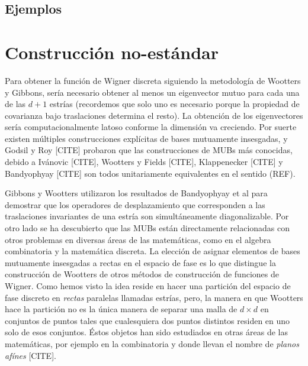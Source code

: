 \documentclass[a4paper]{report}
\begin{document}
  \section{Ejemplos}









  

  \chapter{Construcción no-estándar}

  Para obtener la función de Wigner discreta
  siguiendo la metodología de Wootters y Gibbons, sería
  necesario obtener al menos un eigenvector mutuo para cada
  una de las $d+1$ estrías (recordemos que solo uno es
  necesario porque la propiedad de covarianza bajo
  traslaciones determina el resto). La obtención de los
  eigenvectores sería computacionalmente latoso conforme la
  dimensión va creciendo. Por suerte existen múltiples
  construcciones explícitas de bases mutuamente insesgadas,
  y Godsil y Roy [CITE] probaron que las construcciones de
  MUBs más conocidas, debido a Ivánovic [CITE], Wootters y
  Fields [CITE], Klappenecker [CITE] y Bandyophyay [CITE]
  son todos unitariamente equivalentes en el sentido (REF).

  Gibbons y Wootters utilizaron los resultados de
  Bandyophyay et al para demostrar que los operadores de
  desplazamiento que corresponden a las traslaciones
  invariantes de una estría son simultáneamente
  diagonalizable. Por otro lado se ha descubierto que las
  MUBs están directamente relacionadas con otros problemas
  en diversas áreas de las matemáticas, como en el algebra
  combinatoria y la matemática discreta. La elección de
  asignar elementos de bases mutuamente insesgadas a rectas
  en el espacio de fase es lo que distingue la construcción
  de Wootters de otros métodos de construcción de funciones
  de Wigner. Como hemos visto la idea reside en hacer una
  partición del espacio de fase discreto en \textit{rectas}
  paralelas llamadas estrías, pero, la manera en que
  Wootters hace la partición no es la única manera de
  separar una malla de $d \times d$ en conjuntos de puntos
  tales que cualesquiera dos puntos distintos residen en uno
  solo de esos conjuntos. Éstos objetos han sido estudiados
  en otras áreas de las matemáticas, por ejemplo en la
  combinatoria y donde llevan el nombre de \textit{planos
  afínes} [CITE]. 
\end{document}
